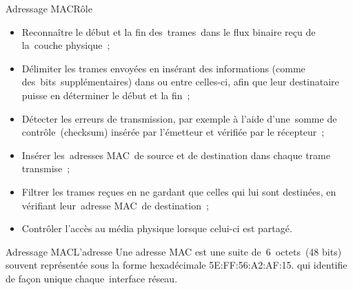 \documentclass{beamer}
\begin{document}
	\begin{frame}{Adressage MAC}{Rôle}

		\begin{itemize}
			\item [\textbullet] Reconnaître le début et la fin des trames dans le flux binaire reçu de la couche physique ;
			\item [\textbullet] Délimiter les trames envoyées en insérant des informations (comme des bits supplémentaires) dans ou entre celles-ci, afin que leur destinataire puisse en déterminer le début et la fin ;
			\item [\textbullet] Détecter les erreurs de transmission, par exemple à l'aide d'une somme de contrôle (checksum) insérée par l'émetteur et vérifiée par le récepteur ;
			\item [\textbullet] Insérer les adresses MAC de source et de destination dans chaque trame transmise ;
			\item [\textbullet] Filtrer les trames reçues en ne gardant que celles qui lui sont destinées, en vérifiant leur adresse MAC de destination ; 
			\item [\textbullet] Contrôler l'accès au média physique lorsque celui-ci est partagé.
		\end{itemize}
	\end{frame}

	\begin{frame}{Adressage MAC}{L'adresse}
		Une adresse MAC est une suite de 6 octets (48 bits) souvent représentée sous la forme hexadécimale 5E:FF:56:A2:AF:15. qui identifie de façon unique chaque interface réseau. \\
	\end{frame}
\end{document}
